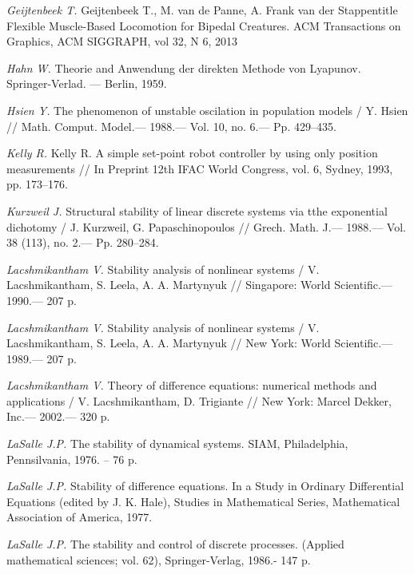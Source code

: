 \begin{thebibliography}{10}
	{\it Geijtenbeek T.} Geijtenbeek T., M. van de Panne, A. Frank van der Stappentitle Flexible Muscle-Based Locomotion for Bipedal Creatures. ACM Transactions on Graphics, ACM SIGGRAPH, vol 32, N 6, 2013
	
	{\it Hahn W.} Theorie and Anwendung der direkten Methode von Lyapunov. Springer-Verlad. — Berlin, 1959.
	
	{\it Hsien Y.} The phenomenon of unstable oscilation in population models / Y. Hsien // Math. Comput. Model.— 1988.— Vol. 10, no. 6.— Pp. 429–435.
	
	
	
	{\it Kelly R.} Kelly R. A simple set-point robot controller by using only position measurements // In Preprint 12th IFAC World Congress, vol. 6, Sydney, 1993, pp. 173–176.
	
	{\it Kurzweil J.} Structural stability of linear discrete systems via tthe exponential dichotomy / J. Kurzweil, G. Papaschinopoulos // Grech. Math. J.— 1988.— Vol. 38 (113), no. 2.— Pp. 280–284.
	
	{\it Lacshmikantham V.} Stability analysis of nonlinear systems / V. Lacshmikantham, S. Leela, A. A. Martynyuk // Singapore: World Scientific.— 1990.— 207 p.
	
	{\it Lacshmikantham V.} Stability analysis of nonlinear systems / V. Lacshmikantham, S. Leela, A. A. Martynyuk // New York: World Scientific.— 1989.— 207 p.
	
	{\it Lacshmikantham V.} Theory of difference equations: numerical methods and applications / V. Lacshmikantham, D. Trigiante // New York: Marcel Dekker, Inc.— 2002.— 320 p.
	
	{\it LaSalle J.P.} The stability of dynamical systems. SIAM, Philadelphia, Pennsilvania, 1976. – 76 p.
	
	{\it LaSalle J.P.} Stability of difference equations. In a Study in Ordinary Differential Equations (edited by J. K. Hale), Studies in Mathematical Series, Mathematical Association of America, 1977.
	
	{\it LaSalle J.P.} The stability and control of discrete processes. (Applied mathematical sciences; vol. 62), Springer-Verlag, 1986.- 147 p.
	

\end{thebibliography}
